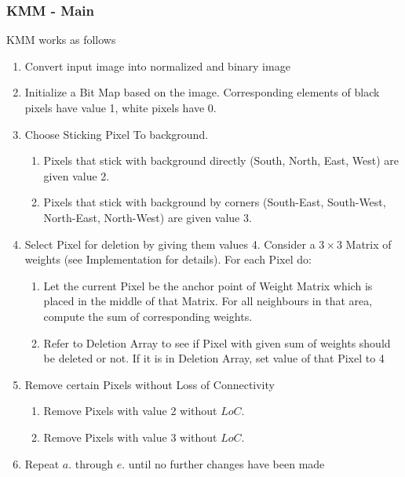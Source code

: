 \documentclass{article}
\begin{document}
\subsubsection{KMM - Main}
KMM works as follows

\begin{enumerate}
	\item Convert input image into normalized and binary image
	\item Initialize a Bit Map based on the image. Corresponding elements of black pixels have value 1, white pixels have 0.
	
	\item Choose Sticking Pixel To background.
	\begin{enumerate}
		\item Pixels that stick with background directly (South, North, East, West) are given value 2. 
		\item Pixels that stick with background by corners (South-East, South-West, North-East, North-West) are given value 3.
	\end{enumerate}
	
	\item Select Pixel for deletion by giving them values 4. Consider a $3 \times 3$ Matrix of weights (see Implementation for details). For each Pixel do:

	\begin{enumerate}
		\item Let the current Pixel be the anchor point of Weight Matrix which is placed in the middle of that Matrix. For all neighbours in that area, compute the sum of corresponding weights.
		\item Refer to Deletion Array to see if Pixel with given sum of weights should be deleted or not. If it is in Deletion Array, set value of that Pixel to 4
	\end{enumerate}
	
	\item Remove certain Pixels without Loss of Connectivity
	\begin{enumerate}
		\item Remove Pixels with value 2 without $LoC$.
		\item Remove Pixels with value 3 without $LoC$.
	\end{enumerate}
	
	\item Repeat $a.$ through $e.$ until no further changes have been made
\end{enumerate}
\end{document}
